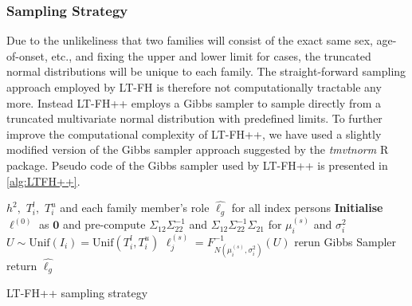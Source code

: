 \subsubsection{Sampling Strategy}

Due to the unlikeliness that two families will consist of the exact same sex, age-of-onset, etc., and fixing the upper and lower limit for cases, the truncated normal distributions will be unique to each family. The straight-forward sampling approach employed by LT-FH is therefore not computationally tractable any more. Instead LT-FH++ employs a Gibbs sampler to sample directly from a truncated multivariate normal distribution with predefined limits. To further improve the computational complexity of LT-FH++, we have used a slightly modified version of the Gibbs sampler approach suggested by the \textit{tmvtnorm} R package\cite{wilhelm2015gibbs,wilhelm2010tmvtnorm}. Pseudo code of the Gibbs sampler used by LT-FH++ is presented in \cref{alg:LTFH++}.


\begin{algorithm}
\begin{algorithmic}[1]
\INPUT $ h^2,$ $T_{i}^l,$ $T_{i}^u$ and each family member's role 
\OUTPUT $ \hat{\ell_g} $ for all index persons
\GIBBS
\STATE \textbf{Initialise} $\ell^{(0)}$ as $ \mathbf{0} $ and pre-compute $ \Sigma_{12} \Sigma_{22}^{-1} $ and $ \Sigma_{12} \Sigma_{22}^{-1} \Sigma_{21} $ for $ \mu_i^{(s)} $ and $ \sigma^2_i $
	  
	\STATE $ U \sim \text{Unif}(I_i) = \text{Unif}(T_i^l, T_i^u) $ 
	\STATE $ \ell_j^{(s)} = F^{-1}_{N(\mu_i^{(s)}, \sigma_i^2)}(U) $
	\ENDFOR
\ENDFOR
{}
\STATE rerun Gibbs Sampler
\ELSE
\STATE return  $ \hat{\ell_g} $
\ENDIF
\end{algorithmic}
\caption{LT-FH++ sampling strategy}
\label{alg:LTFH++}
\end{algorithm}


